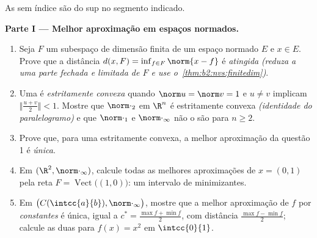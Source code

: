 \begin{problem}
\label{pb:b2:nvs:1}
As  sem índice são  do sup no segmento indicado.

\medskip
\noindent\textbf{Parte I --- Melhor aproximação em espaços
normados.}
\begin{enumerate}
  \item Seja $F$ um subespaço de dimensão finita de um espaço
        normado $E$ e $x \in E$. Prove que a distância $d(x,
        F) = \inf_{f \in F}\norm{x - f}$ é \emph{atingida}
        \emph{(reduza a uma parte fechada e limitada de $F$ e use
        o~\cref{thm:b2:nvs:finitedim})}.
  \item Uma  é \emph{estritamente convexa} quando $\norm u = \norm v
        = 1$ e $u \neq v$ implicam $\bigl\Vert\frac{u +
        v}2\bigr\Vert < 1$. Mostre que $\norm\cdot_2$ em $\R^n$
        é estritamente convexa \emph{(identidade do paralelogramo)} e
        que $\norm\cdot_1$ e $\norm\cdot_\infty$ não o são para
        $n \geq 2$.
  \item Prove que, para uma  estritamente convexa, a melhor
        aproximação da questão 1 é \emph{única}.
  \item Em $(\R^2, \norm\cdot_\infty)$, calcule todas as melhores
        aproximações de $x = (0, 1)$ pela reta $F =
        \operatorname{Vect}\bigl((1,0)\bigr)$: um intervalo de
        minimizantes.
  \item Em $\bigl(C(\intcc{a}{b}), \norm\cdot_\infty\bigr)$,
        mostre que a melhor aproximação de $f$ por
        \emph{constantes} é única, igual a $c^* = \frac{\max f
        + \min f}{2}$, com distância $\frac{\max f - \min
        f}{2}$; calcule as duas para $f(x) = x^2$ em
        $\intcc{0}{1}$.
\end{enumerate}


\end{problem}

